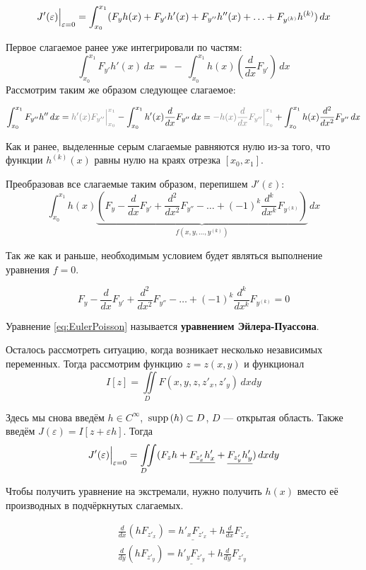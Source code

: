 \documentclass[12pt]{article}
\begin{document}
	$$J'(\varepsilon)\Big|_{\varepsilon = 0}^{} = \int_{x_0}^{x_1} (F_y h(x) + F_{y'}h'(x) 
	  + F_{y''}h''(x) + \ldots + F_{y^{(k)}}h^{(k)})\,dx$$
	
	Первое слагаемое ранее уже интегрировали по частям: 
	$$\int_{x_0}^{x_1} F_{y'}h'(x)\,dx~=~-~\int_{x_0}^{x_1} h(x)\left(\frac{d}{dx} F_{y'}\right)\,dx$$
	Рассмотрим таким же образом следующее слагаемое:
	
	$$\int_{x_0}^{x_1} F_{y''}h'' \,dx = \off{h'(x)F_{y''}\lims{x_0}{x_1}} - \int_{x_0}^{x_1} h'(x)\frac{d}{dx}F_{y''} \,dx
	  = \off{-h(x)\frac{d}{dx} F_{y''}\lims{x_0}{x_1}} + \int_{x_0}^{x_1} h(x) \frac{d^2}{dx^2}F_{y''} \,dx$$
	  
	Как и ранее, выделенные серым слагаемые равняются нулю из-за того, что
	функции $h^{(k)}(x)$ равны нулю на краях отрезка $[x_0, x_1]$.
	
	Преобразовав все слагаемые таким образом, перепишем $J'(\varepsilon)$:
	$$\int_{x_0}^{x_1} h(x)
	  \underbrace{\left(F_y - \frac{d}{dx}F_{y'} + \frac{d^2}{dx^2}F_{y''} - 
	  \ldots + (-1)^k\frac{d^k}{dx^k}F_{y^{(k)}}\right)}_{f(x, y, \ldots, y^{(k)})} \,dx$$
	
	Так же как и раньше, необходимым условием будет являться выполнение уравнения $f = 0$.
	
	\begin{equation} \label{eq:EulerPoisson}
			F_y - \frac{d}{dx}F_{y'} + \frac{d^2}{dx^2}F_{y''} - 
	  \ldots + (-1)^k\frac{d^k}{dx^k}F_{y^{(k)}} = 0
	\end{equation}
	
	Уравнение \ref{eq:EulerPoisson} называется \textbf{уравнением Эйлера-Пуассона}.
	
	Осталось рассмотреть ситуацию, когда возникает несколько независимых переменных. Тогда рассмотрим функцию
	$z = z(x,y)$ и функционал
	$$I[z] = \underset{D\hspace{10pt}}{\iint} F(x, y, z, z'_x, z'_y) \,dxdy$$
	
	Здесь мы снова введём $h \in C^{\infty}$, $\,\text{supp}\,(h) \subset D$, $D$ --- открытая область. Также введём
	$J(\varepsilon) = I[z + \varepsilon h]$. Тогда 
	$$J'(\varepsilon)\Big|_{\varepsilon = 0}^{} = 
	  \underset{D\hspace{10pt}}{\iint} (F_zh + \underline{F_{z'_x}h'_x} + \underline{F_{z'_y}h'_y}) \,dxdy$$
	  
	Чтобы получить уравнение на экстремали, нужно получить $h(x)$ вместо её производных в подчёркнутых слагаемых.
	
	\begin{align*}
			\frac{d}{dx}(h F_{z'_x}) = \underline{h'_xF_{z'_x}} + h\frac{d}{dx}F_{z'_x} \\
			\frac{d}{dy}(h F_{z'_y}) = \underline{h'_yF_{z'_y}} + h\frac{d}{dy}F_{z'_y}
	\end{align*}
	
\end{document}

